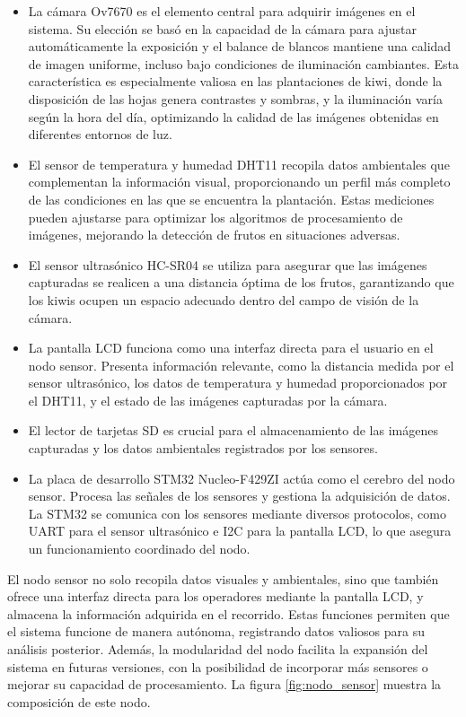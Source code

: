 \begin{itemize}
\item La cámara Ov7670 es el elemento central para adquirir imágenes en el sistema. Su elección se basó en la capacidad de la cámara para ajustar automáticamente la exposición y el balance de blancos mantiene una calidad de imagen uniforme, incluso bajo condiciones de iluminación cambiantes. Esta característica es especialmente valiosa en las plantaciones de kiwi, donde la disposición de las hojas genera contrastes y sombras, y la iluminación varía según la hora del día, optimizando la calidad de las imágenes obtenidas en diferentes entornos de luz.

\item El sensor de temperatura y humedad DHT11 recopila datos ambientales que complementan la información visual, proporcionando un perfil más completo de las condiciones en las que se encuentra la plantación. Estas mediciones pueden ajustarse para optimizar los algoritmos de procesamiento de imágenes, mejorando la detección de frutos en situaciones adversas.
\item El sensor ultrasónico HC-SR04 se utiliza para asegurar que las imágenes capturadas se realicen a una distancia óptima de los frutos, garantizando que los kiwis ocupen un espacio adecuado dentro del campo de visión de la cámara.
\item La pantalla LCD funciona como una interfaz directa para el usuario en el nodo sensor. Presenta información relevante, como la distancia medida por el sensor ultrasónico, los datos de temperatura y humedad proporcionados por el DHT11, y el estado de las imágenes capturadas por la cámara.
\item El lector de tarjetas SD es crucial para el almacenamiento de las imágenes capturadas y los datos ambientales registrados por los sensores.
\item La placa de desarrollo STM32 Nucleo-F429ZI actúa como el cerebro del nodo sensor. Procesa las señales de los sensores y gestiona la adquisición de datos. La STM32 se comunica con los sensores mediante diversos protocolos, como UART para el sensor ultrasónico e I2C para la pantalla LCD, lo que asegura un funcionamiento coordinado del nodo.
\end{itemize}

El nodo sensor no solo recopila datos visuales y ambientales, sino que también ofrece una interfaz directa para los operadores mediante la pantalla LCD, y almacena la información adquirida en el recorrido. Estas funciones permiten que el sistema funcione de manera autónoma, registrando datos valiosos para su análisis posterior. Además, la modularidad del nodo facilita la expansión del sistema en futuras versiones, con la posibilidad de incorporar más sensores o mejorar su capacidad de procesamiento. La figura \ref{fig:nodo_sensor} muestra la composición de este nodo.

